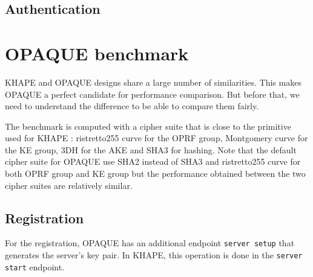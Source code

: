 \documentclass[../report.tex]{subfiles}
\begin{document}
\subsection*{Authentication}




\section{OPAQUE benchmark} %


KHAPE and OPAQUE designs share a large number of similarities. This makes OPAQUE a perfect candidate for performance comparison. But before that, we need to understand the difference to be able to compare them fairly.

The benchmark is computed with a cipher suite that is close to the primitive used for KHAPE : ristretto255 curve for the OPRF group, Montgomery curve for the KE group, 3DH for the AKE and SHA3 for hashing.
Note that the default cipher suite for OPAQUE use SHA2 instead of SHA3 and ristretto255 curve for both OPRF group and KE group but the performance obtained between the two cipher suites are relatively similar.


\pgfplotsset{width=\textwidth-1.1cm}


\subsection*{Registration}
For the registration, OPAQUE has an additional endpoint \verb|server setup| that generates the server's key pair. In KHAPE, this operation is done in the \verb|server start| endpoint.
\end{document}
